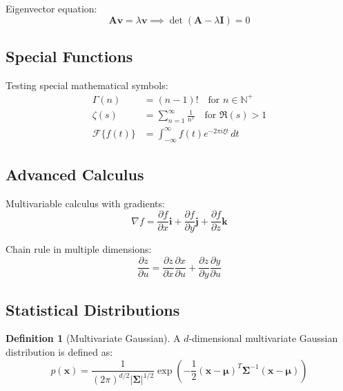 \documentclass[11pt,a4paper]{article}
\theoremstyle{definition}
\newtheorem{definition}{Definition}[section]
\begin{document}
Eigenvector equation:
\begin{equation}
    \mathbf{A}\mathbf{v} = \lambda\mathbf{v} \implies \det(\mathbf{A} - \lambda\mathbf{I}) = 0
\end{equation}

\subsection{Special Functions}

Testing special mathematical symbols:
\begin{align}
    \Gamma(n) &= (n-1)! \quad \text{for } n \in \mathbb{N}^+ \\
    \zeta(s) &= \sum_{n=1}^{\infty} \frac{1}{n^s} \quad \text{for } \Re(s) > 1 \\
    \mathcal{F}\{f(t)\} &= \int_{-\infty}^{\infty} f(t)e^{-2\pi i \xi t}\,dt
\end{align}

\subsection{Advanced Calculus}

Multivariable calculus with gradients:
\begin{equation}
    \nabla f = \frac{\partial f}{\partial x}\mathbf{i} + \frac{\partial f}{\partial y}\mathbf{j} + \frac{\partial f}{\partial z}\mathbf{k}
\end{equation}

Chain rule in multiple dimensions:
\begin{equation}
    \frac{\partial z}{\partial u} = \frac{\partial z}{\partial x}\frac{\partial x}{\partial u} + \frac{\partial z}{\partial y}\frac{\partial y}{\partial u}
\end{equation}

\subsection{Statistical Distributions}

\begin{definition}[Multivariate Gaussian]
A $d$-dimensional multivariate Gaussian distribution is defined as:
\begin{equation}
    p(\mathbf{x}) = \frac{1}{(2\pi)^{d/2}|\mathbf{\Sigma}|^{1/2}} \exp\left(-\frac{1}{2}(\mathbf{x}-\bm{\mu})^T\mathbf{\Sigma}^{-1}(\mathbf{x}-\bm{\mu})\right)
\end{equation}
\end{definition}
\end{document}
